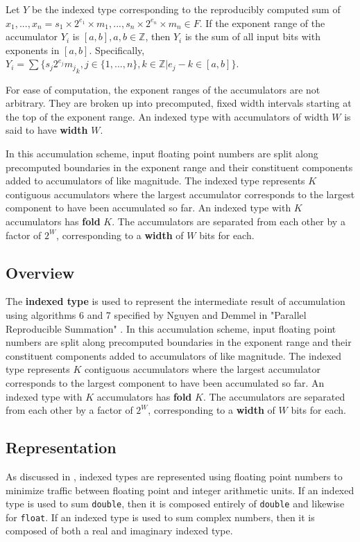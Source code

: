 \documentclass[12pt]{article}
\providecommand{\Z}{\ensuremath{\mathbb{Z}}}
\begin{document}
    Let $Y$ be the indexed type corresponding to the reproducibly computed sum of $x_1, ..., x_n = s_1 \times 2^{e_1} \times m_1, ..., s_n \times 2^{e_n} \times m_n \in F$.
    If the exponent range of the accumulator $Y_i$ is $[a, b], a, b \in \Z$, then $Y_i$ is the sum of all input bits with exponents in $[a, b]$. Specifically, $Y_i = \sum \{s_j2^{e_j}{m_j}_k, j \in \{1, ..., n\}, k \in \Z | e_j - k \in [a, b]\}$.

    For ease of computation, the exponent ranges of the accumulators are not arbitrary. They are broken up into precomputed, fixed width intervals starting at the top of the exponent range. An indexed type with accumulators of width $W$ is said to have \textbf{width} $W$.

In this accumulation scheme, input floating point numbers are split along precomputed boundaries in the exponent range and their constituent components added to accumulators of like magnitude. The indexed type represents $K$ contiguous accumulators where the largest accumulator corresponds to the largest component to have been accumulated so far. An indexed type with $K$ accumulators has \textbf{fold} $K$. The accumulators are separated from each other by a factor of $2^W$, corresponding to a \textbf{width} of $W$ bits for each. 
  \subsection{Overview}
    The \textbf{indexed type} is used to represent the intermediate result of accumulation using algorithms 6 and 7 specified by Nguyen and Demmel in "Parallel Reproducible Summation" \cite{parallelreproduciblesummation}. In this accumulation scheme, input floating point numbers are split along precomputed boundaries in the exponent range and their constituent components added to accumulators of like magnitude. The indexed type represents $K$ contiguous accumulators where the largest accumulator corresponds to the largest component to have been accumulated so far. An indexed type with $K$ accumulators has \textbf{fold} $K$. The accumulators are separated from each other by a factor of $2^W$, corresponding to a \textbf{width} of $W$ bits for each.
  \subsection{Representation}

    As discussed in \cite{parallelreproduciblesummation}, indexed types are represented using floating point numbers to minimize traffic between floating point and integer arithmetic units. If an indexed type is used to sum \verb|double|, then it is composed entirely of \verb|double| and likewise for \verb|float|. If an indexed type is used to sum complex numbers, then it is composed of both a real and imaginary indexed type.
\end{document}
